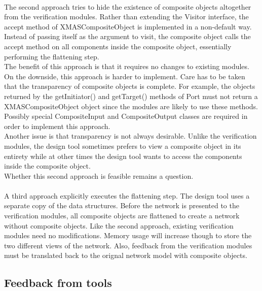 \documentclass[a4paper,11pt]{article}
\begin{document}
\paragraph{}
The second approach tries to hide the existence of composite objects altogether
from the verification modules. Rather than extending the Visitor interface,
the accept method of XMASCompositeObject is implemented in a non-default way.
Instead of passing itself as the argument to visit, the composite object calls
the accept method on all components inside the composite object, essentially
performing the flattening step.\\
The benefit of this approach is that it requires no changes to existing modules.
On the downside, this approach is harder to implement. Care has to be taken
that the transparency of composite objects is complete. For example, the objects
returned by the getInitiator() and getTarget() methods of Port must not return a
XMASCompositeObject object since the modules are likely to use these methods.
Possibly special CompositeInput and CompositeOutput classes are required in
order to implement this approach.\\
Another issue is that transparency is not always desirable.
Unlike the verification modules, the design tool sometimes prefers to
view a composite object in its entirety while at other times the design
tool wants to access the components inside the composite object.\\
Whether this second approach is feasible remains a question.

\paragraph{}
A third approach explicitly executes the flattening step. The design tool
uses a separate copy of the data structures. Before the network is
presented to the verification modules, all composite objects are flattened
to create a network without composite objects. Like the second approach,
existing verification modules need no modifications. Memory usage will
increase though to store the two different views of the network. Also,
feedback from the verification modules must be translated back to the
orignal network model with composite objects.



\subsection{Feedback from tools}
\end{document}
